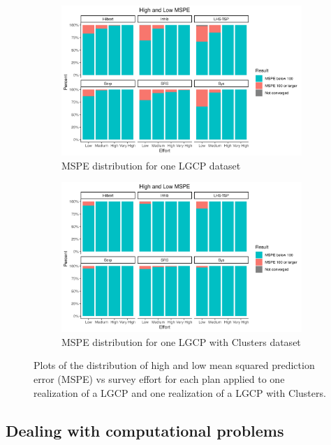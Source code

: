 \documentclass[review]{elsarticle}
\begin{document}
\begin{figure}

\begin{subfigure}{4.5in}
\includegraphics[width=4.5in]{../graphics/HighMSPE-LGCP000004.png}
\caption{MSPE distribution for one LGCP dataset}
\label{highmspelgcp}
\end{subfigure}

\begin{subfigure}{4.5in}
\includegraphics[width=4.5in]{../graphics/HighMSPE-Cluster000004.png}
\caption{MSPE distribution for one LGCP with Clusters dataset}
\label{highmspecluster}
\end{subfigure}

\caption{Plots of the distribution of high and low mean squared prediction
error (MSPE) vs survey effort for each plan applied to one realization of a
LGCP and one realization of a LGCP with Clusters.}
\label{histmsperesults}
\end{figure}


\subsection{Dealing with computational problems}
\label{compissues}
\end{document}
